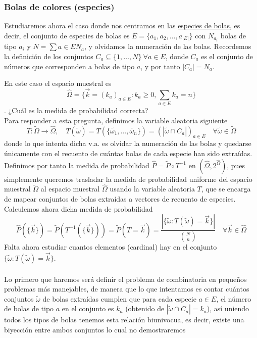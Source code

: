 \subsubsection{Bolas de colores (especies)}
\noindent
Estudiaremos ahora el caso donde nos centramos en las \underline{especies de bolas}, es decir, el conjunto de especies de bolas es $E=\{a_1, a_2, \ldots, a_{|E|}\}$ con $N_{a_i}$ bolas de tipo $a_i$ y $N=\sum{a\in E} N_a$, y olvidamos la numeración de las bolas. Recordemos la definición de los conjuntos $C_a\subseteq \{1, \ldots, N\} \ \forall a\in E$, donde $C_a$ es el conjunto de números que corresponden a bolas de tipo $a$, y por tanto $|C_a|=N_a$. 

\noindent
En este caso el espacio muestral es
\begin{equation*}
    \hat{\Omega} = \{\vec{k}=(k_a)_{a\in E}: k_a \geq 0, \sum_{a\in E} k_a = n\}
\end{equation*}
. ¿Cuál es la medida de probabilidad correcta? \\
\noindent
Para responder a esta pregunta, definimos la variable aleatoria siguiente
\begin{equation*}
    T:\tilde{\Omega} \to \hat{\Omega}, \quad T(\tilde{\omega}) = T(\{\tilde{\omega_1}, \ldots, \tilde{\omega_n}\}) = (|\tilde{\omega} \cap C_a|)_{a\in E} \quad \forall \tilde{\omega}\in \tilde{\Omega}
\end{equation*}
donde lo que intenta dicha v.a. es olvidar la numeración de las bolas y quedarse únicamente con el recuento de cuántas bolas de cada especie han sido extraídas. Definimos por tanto la medida de probabilidad $\hat{P} = \tilde{P} \circ T^{-1}$ en $(\hat{\Omega}, 2^{\hat{\Omega}})$, pues simplemente queremos trasladar la medida de probabilidad uniforme del espacio muestral $\tilde{\Omega}$ al espacio muestral $\hat{\Omega}$ usando la variable aleatoria $T$, que se encarga de mapear conjuntos de bolas extraídas a vectores de recuento de especies. Calculemos ahora dicha medida de probabilidad
\begin{equation*}
    \hat{P}(\{\vec{k}\}) = \tilde{P}(T^{-1}(\{\vec{k}\})) = \tilde{P}(T=\vec{k}) = \dfrac{|\{\tilde{\omega} : T(\tilde{\omega})=\vec{k}\}|}{\binom{N}{n}} \quad \forall \vec{k} \in \hat{\Omega}
\end{equation*}
Falta ahora estudiar cuantos elementos (cardinal) hay en el conjunto $\{\tilde{\omega} : T(\tilde{\omega})=\vec{k}\}$. \\ \\
\noindent
Lo primero que haremos será definir el problema de combinatoria en pequeños problemas más manejables, de manera que lo que intentamos es contar cuántos conjuntos $\tilde{\omega}$ de bolas extraídas cumplen que para cada especie $a\in E$, el número de bolas de tipo $a$ en el conjunto es $k_a$ (obtenido de $|\tilde{\omega}\cap C_a|=k_a$), así uniendo todos los tipos de bolas tenemos esta relación biunivocua, es decir, existe una biyección entre ambos conjuntos lo cual no demostraremos
